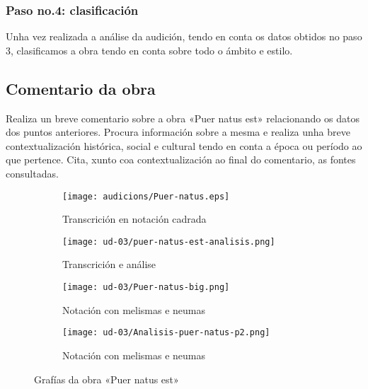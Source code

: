 \subsubsection*{Paso no.4: clasificación} 
Unha vez realizada a análise da audición, tendo en conta os datos obtidos no 
paso 3, clasificamos a obra tendo en conta sobre todo o ámbito e estilo.
%
\subsection*{Comentario da obra}\label{subsec:comentario-puer-natus}
%
Realiza un breve comentario sobre a obra «Puer natus est» relacionando os datos dos puntos anteriores. Procura información sobre a mesma e realiza unha breve contextualización histórica, social e cultural tendo en conta a época ou período ao que pertence. Cita, xunto coa contextualización ao final do comentario, as fontes consultadas.
%
%
\begin{figure}[h!]
\vspace*{2.0cm}
\centering
\begin{subfigure}[b]{0.45\textwidth}
\texttt{[image: audicions/Puer-natus.eps]}
\caption{Transcrición en notación cadrada}
\label{fig:Puer-natus1}
\end{subfigure}
\begin{subfigure}[b]{0.45\textwidth}
\texttt{[image: ud-03/puer-natus-est-analisis.png]}
\caption{Transcrición e análise}
\label{fig:Puer-natus3}
\end{subfigure}
\par
\vspace*{1.50cm}
\begin{subfigure}[b]{0.45\textwidth}
\texttt{[image: ud-03/Puer-natus-big.png]}
\caption{Notación con melismas e neumas}
\label{fig:Puer-natus2}
\end{subfigure}
\begin{subfigure}[b]{0.50\textwidth}
\texttt{[image: ud-03/Analisis-puer-natus-p2.png]}
\caption{Notación con melismas e neumas}
\label{fig:Puer-natus4}
\end{subfigure}
\caption{Grafías da obra «Puer natus est»}
\label{fig:Grafía e texto da obra «Puer natus est»}
\vspace*{1.0cm}
\end{figure}
%
%
